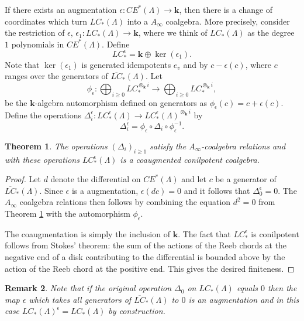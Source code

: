 \documentclass{gtpart}
\newtheorem{thm}{Theorem}
\newtheorem{rem}[thm]{Remark}
\renewcommand{\k}{\mathbf{k}}
\begin{document}
If there exists an augmentation $\epsilon\colon CE^*(\Lambda) \to \k$, then there is a change of coordinates which turn $LC_{\ast}(\Lambda)$ into a $A_{\infty}$ coalgebra. More precisely, consider the restriction of $\epsilon$, $\epsilon_{1}\colon LC_{\ast}(\Lambda)\to\k$, where we think of $LC_{\ast}(\Lambda)$ as the degree $1$ polynomials in $CE^{\ast}(\Lambda)$. Define
\[ 
LC_{\ast}^{\epsilon}=\k\oplus \ker(\epsilon_{1}).
\]   
Note that $\ker(\epsilon_{1})$ is generated idempotents $e_{v}$ and by $c-\epsilon(c)$, where $c$ ranges over the generators of $\overline{LC}_{\ast}(\Lambda)$. Let
\[ 
\phi_{\epsilon}\colon \bigoplus_{i\geq 0} LC_*^{\otimes_{\k}i}\to \bigoplus_{i\geq 0} LC_*^{\otimes_{\k}i},
\]
be the $\k$-algebra automorphism defined on generators as $\phi_{\epsilon}(c)=c+\epsilon(c)$. Define the operations $\Delta_i^\epsilon\colon LC_{\ast}^{\epsilon}(\Lambda)\to LC_{\ast}^{\epsilon}(\Lambda)^{\otimes_{\k} i}$ by
\[ \Delta_i^\epsilon  = \phi_\epsilon \circ \Delta_i \circ \phi_{\epsilon}^{-1}. \]
 
\begin{thm} \label{noncurved} 
The operations $(\Delta_{i})_{i \geq 1}$ satisfy the $A_\infty$-coalgebra relations and with these operations $LC_{\ast}^{\epsilon}(\Lambda)$ is a coaugmented conilpotent coalgebra.
\end{thm}

\begin{proof}
Let $d$ denote the differential on $CE^{\ast}(\Lambda)$ and let $c$ be a generator of $\overline{LC}_{\ast}(\Lambda)$. Since $\epsilon$ is a augmentation, $\epsilon(dc)=0$ and it follows that $\Delta_{0}^{\epsilon}=0$. The $A_{\infty}$ coalgebra relations then follows by combining the equation $d^{2}=0$ from Theorem \ref{noncurved} with the automorphism $\phi_{\epsilon}$. 

The coaugmentation is simply the inclusion of $\k$. The fact that $LC^{\epsilon}_{\ast}$ is
    conilpotent follows from Stokes' theorem: the sum of the actions of the Reeb chords at the negative end of a disk contributing to the differential is bounded above by the action of the Reeb chord at the positive end. This gives the desired finiteness.    
\end{proof}
 
\begin{rem}
Note that if the original operation $\Delta_{0}$ on $LC_{\ast}(\Lambda)$ equals $0$ then the map $\epsilon$ which takes all generators of $\overline{LC}_{\ast}(\Lambda)$ to $0$ is an augmentation and in this case $LC_{\ast}(\Lambda)^{\epsilon}=LC_{\ast}(\Lambda)$ by construction.
\end{rem} 
\end{document}
